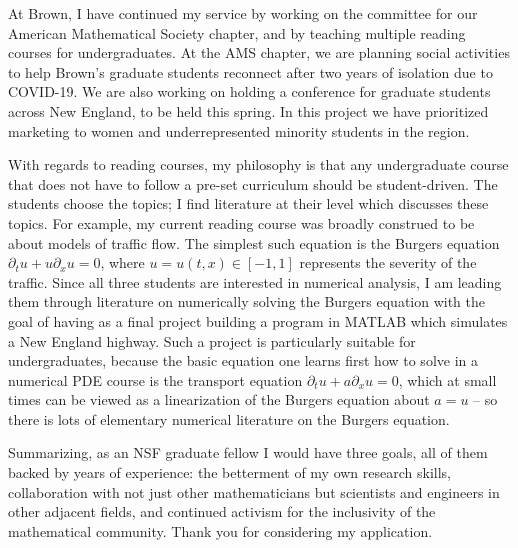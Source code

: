 \documentclass[12pt]{article}
\begin{document}
At Brown, I have continued my service by working on the committee for our American Mathematical Society chapter, and by teaching multiple reading courses for undergraduates.
At the AMS chapter, we are planning social activities to help Brown's graduate students reconnect after two years of isolation due to COVID-19.
We are also working on holding a conference for graduate students across New England, to be held this spring.
In this project we have prioritized marketing to women and underrepresented minority students in the region.

With regards to reading courses, my philosophy is that any undergraduate course that does not have to follow a pre-set curriculum should be student-driven.
The students choose the topics; I find literature at their level which discusses these topics.
For example, my current reading course was broadly construed to be about models of traffic flow.
The simplest such equation is the Burgers equation $\partial_t u + u \partial_x u = 0$, where $u = u(t, x) \in [-1, 1]$ represents the severity of the traffic.
Since all three students are interested in numerical analysis, I am leading them through literature on numerically solving the Burgers equation with the goal of having as a final project building a program in MATLAB which simulates a New England highway.
Such a project is particularly suitable for undergraduates, because the basic equation one learns first how to solve in a numerical PDE course is the transport equation $\partial_t u + a \partial_x u = 0$, which at small times can be viewed as a linearization of the Burgers equation about $a = u$ -- so there is lots of elementary numerical literature on the Burgers equation.

Summarizing, as an NSF graduate fellow I would have three goals, all of them backed by years of experience: the betterment of my own research skills, collaboration with not just other mathematicians but scientists and engineers in other adjacent fields, and continued activism for the inclusivity of the mathematical community.
Thank you for considering my application.


%
%
\small
\printbibliography
\end{document}
